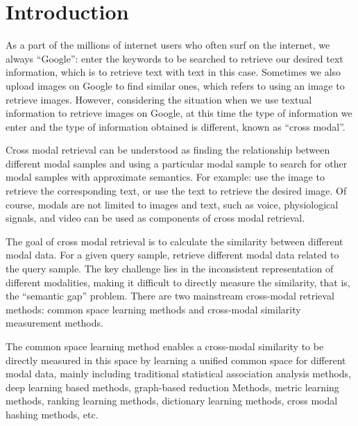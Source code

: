\chapter{Introduction}
\label{cha:intro}



As a part of the millions of internet users who often surf on the internet, we always ``Google'': enter the keywords to be searched to retrieve our desired text information, which is to retrieve text with text in this case. Sometimes we also upload images on Google to find similar ones, which refers to using an image to retrieve images. However, considering the situation when we use textual information to retrieve images on Google, at this time the type of information we enter and the type of information obtained is different, known as ``cross modal''.

Cross modal retrieval can be understood as finding the relationship between different modal samples and using a particular modal sample to search for other modal samples with approximate semantics. For example: use the image to retrieve the corresponding text, or use the text to retrieve the desired image. Of course, modals are not limited to images and text, such as voice, physiological signals, and video can be used as components of cross modal retrieval.

The goal of cross modal retrieval is to calculate the similarity between different modal data. For a given query sample, retrieve different modal data related to the query sample. The key challenge lies in the inconsistent representation of different modalities, making it difficult to directly measure the similarity, that is, the ``semantic gap'' problem. There are two mainstream cross-modal retrieval methods: common space learning methods and cross-modal similarity measurement methods.

The common space learning method enables a cross-modal similarity to be directly measured in this space by learning a unified common space for different modal data, mainly including traditional statistical association analysis methods, deep learning based methods, graph-based reduction Methods, metric learning methods, ranking learning methods, dictionary learning methods, cross modal hashing methods, etc.

